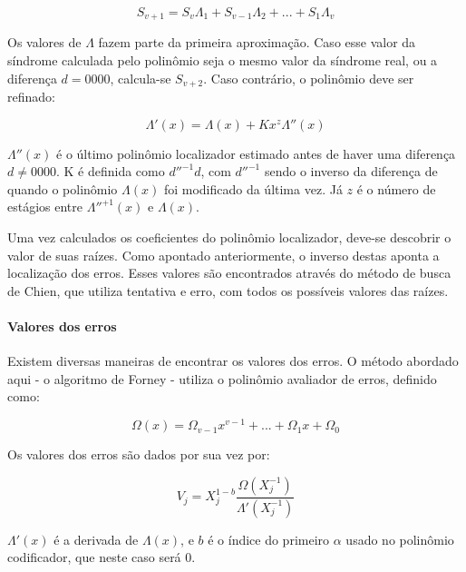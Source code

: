 	\begin{equation}
	S_{v + 1} = S_{v}\Lambda_{1} + S_{v-1}\Lambda_{2} + ... + S_{1}\Lambda_{v}
	\end{equation}
	
	Os valores de $\Lambda$ fazem parte da primeira aproximação. Caso esse valor da síndrome calculada pelo polinômio seja o mesmo valor da síndrome real, ou a diferença $d = 0000$, calcula-se $S_{v + 2}$. Caso contrário, o polinômio deve ser refinado:
	
	\begin{equation}
	\Lambda'(x) = \Lambda(x) +  Kx^{z}\Lambda''(x)
	\end{equation}
	
	$\Lambda''(x)$ é o último polinômio localizador estimado antes de haver uma diferença $d \neq 0000$. K é definida como $d''^{-1}d$, com $d''^{-1}$ sendo o inverso da diferença de quando o polinômio $\Lambda(x)$ foi modificado da última vez. Já $z$ é o número de estágios entre $\Lambda''^{+1}(x)$ e $\Lambda(x)$.
	
	Uma vez calculados os coeficientes do polinômio localizador, 
	deve-se descobrir o valor de suas raízes. Como apontado anteriormente, o inverso destas aponta a localização dos erros. Esses valores são encontrados através do método de busca de Chien, que utiliza tentativa e erro, com todos os possíveis valores das raízes.
	
	\paragraph{Valores dos erros}
	
	Existem diversas maneiras de encontrar os valores dos erros. O método abordado aqui - o algoritmo de Forney - utiliza o polinômio avaliador de erros, definido como:
	
	\begin{equation}
	\Omega(x) = \Omega_{v-1}x^{v-1} + ... + \Omega_{1}x + \Omega_{0}
	\end{equation}
	
	Os valores dos erros são dados por sua vez por:
	
	\begin{equation}
	V_{j} = X_{j}^{1-b} \frac{\Omega(X_{j}^{-1})}{\Lambda'(X_{j}^{-1})}
	\end{equation}
	
	$\Lambda'(x)$ é a derivada de $\Lambda(x)$, e $b$ é o índice do primeiro $\alpha$ usado no polinômio codificador, que neste caso será 0.
	
